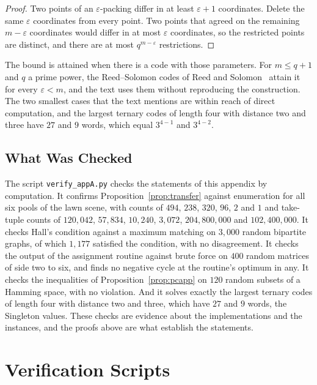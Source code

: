 \documentclass[11pt,twoside,openright]{book}
\theoremstyle{plain}
\theoremstyle{definition}
\theoremstyle{remark}
\begin{document}
\begin{proof}
Two points of an $\varepsilon$-packing differ in at least $\varepsilon+1$ coordinates. Delete the same $\varepsilon$ coordinates from every point. Two points that agreed on the remaining $m-\varepsilon$ coordinates would differ in at most $\varepsilon$ coordinates, so the restricted points are distinct, and there are at most $q^{m-\varepsilon}$ restrictions.
\end{proof}

The bound is attained when there is a code with those parameters. For $m\le q+1$ and $q$ a prime power, the Reed--Solomon codes of Reed and Solomon~\cite{reed1960} attain it for every $\varepsilon<m$, and the text uses them without reproducing the construction. The two smallest cases that the text mentions are within reach of direct computation, and the largest ternary codes of length four with distance two and three have $27$ and $9$ words, which equal $3^{4-1}$ and $3^{4-2}$.

\section{What Was Checked}\label{sec:checkapp}

The script \texttt{verify\_appA.py} checks the statements of this appendix by computation. It confirms Proposition~\ref{prop:transfer} against enumeration for all six pools of the lawn scene, with counts of $494$, $238$, $320$, $96$, $2$ and $1$ and take-tuple counts of $120{,}042$, $57{,}834$, $10{,}240$, $3{,}072$, $204{,}800{,}000$ and $102{,}400{,}000$. It checks Hall's condition against a maximum matching on $3{,}000$ random bipartite graphs, of which $1{,}177$ satisfied the condition, with no disagreement. It checks the output of the assignment routine against brute force on $400$ random matrices of side two to six, and finds no negative cycle at the routine's optimum in any. It checks the inequalities of Proposition~\ref{prop:pcapp} on $120$ random subsets of a Hamming space, with no violation. And it solves exactly the largest ternary codes of length four with distance two and three, which have $27$ and $9$ words, the Singleton values. These checks are evidence about the implementations and the instances, and the proofs above are what establish the statements.

\chapter{Verification Scripts}
\label{app:scripts}
\end{document}
